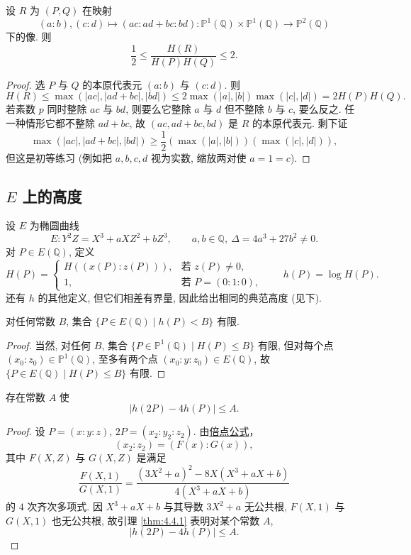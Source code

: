 \begin{lemma} \label{thm:4.4.2} 
设 $R$ 为 $(P, Q)$ 在映射
\[
(a:b), (c:d)\mapsto(ac:ad+bc:bd)\colon\mathbb{P}^1(\mathbb{Q})\times\mathbb{P}^1(\mathbb{Q})\to\mathbb{P}^2(\mathbb{Q})
\]
下的像. 则
\[
\frac{1}{2}\le\frac{H(R)}{H(P)H(Q)}\le 2.
\]
\end{lemma}

\begin{proof}
选 $P$ 与 $Q$ 的本原代表元 $(a:b)$ 与 $(c:d)$. 则
\[
H(R)\le\max(|ac|, |ad+bc|, |bd|)\le 2\max(|a|, |b|)\max(|c|, |d|) = 2H(P)H(Q).
\]
若素数 $p$ 同时整除 $ac$ 与 $bd$, 则要么它整除 $a$ 与 $d$ 但不整除 $b$ 与 $c$, 要么反之. 任一种情形它都不整除 $ad + bc$, 故 $(ac, ad+bc, bd)$ 是 $R$ 的本原代表元. 剩下证
\[
\max(|ac|, |ad+bc|, |bd|)\ge\frac{1}{2}(\max(|a|, |b|))(\max(|c|, |d|)),
\]
但这是初等练习 (例如把 $a, b, c, d$ 视为实数, 缩放两对使 $a = 1 = c$).
\end{proof}

\subsection*{$E$ 上的高度}

设 $E$ 为椭圆曲线
\[
E\colon Y^2Z = X^3 + aXZ^2 + bZ^3, \qquad a, b\in\mathbb{Q}, \ \Delta = 4a^3 + 27b^2\neq 0.
\]
对 $P\in E(\mathbb{Q})$, 定义
\[
H(P) = \begin{cases} H((x(P):z(P))), & \text{若 } z(P)\neq 0,\\ 1, & \text{若 } P = (0:1:0), \end{cases}
\qquad
h(P) = \log H(P).
\]
还有 $h$ 的其他定义, 但它们相差有界量, 因此给出相同的典范高度 (见下).

\begin{lemma} \label{thm:4.4.3} 
对任何常数 $B$, 集合 $\{P\in E(\mathbb{Q}) \mid h(P) < B\}$ 有限.
\end{lemma}

\begin{proof}
当然, 对任何 $B$, 集合 $\{P\in\mathbb{P}^1(\mathbb{Q}) \mid H(P)\le B\}$ 有限, 但对每个点 $(x_0:z_0)\in\mathbb{P}^1(\mathbb{Q})$, 至多有两个点 $(x_0:y:z_0)\in E(\mathbb{Q})$, 故 $\{P\in E(\mathbb{Q}) \mid H(P)\le B\}$ 有限.
\end{proof}

\begin{lemma} \label{thm:4.4.4} 
存在常数 $A$ 使
\[
|h(2P) - 4h(P)|\le A.
\]
\end{lemma}

\begin{proof}
设 $P = (x:y:z)$, $2P = (x_2:y_2:z_2)$. 由\hyperref[eq:dup]{倍点公式}，
\[
(x_2:z_2) = (F(x):G(x)),
\]
其中 $F(X, Z)$ 与 $G(X, Z)$ 是满足
\[
\frac{F(X, 1)}{G(X, 1)} = \frac{(3X^2+a)^2 - 8X(X^3+aX+b)}{4(X^3+aX+b)}
\]
的 $4$ 次齐次多项式. 因 $X^3 + aX + b$ 与其导数 $3X^2 + a$ 无公共根, $F(X, 1)$ 与 $G(X, 1)$ 也无公共根, 故引理 \ref{thm:4.4.1} 表明对某个常数 $A$,
\[
|h(2P) - 4h(P)|\le A.
\]
\end{proof}

